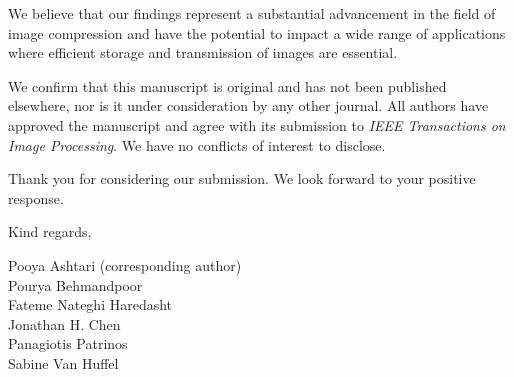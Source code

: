 \documentclass[a4paper,12pt]{letter}
\begin{document}
\begin{letter}
We believe that our findings represent a substantial advancement in the field of image compression and have the potential to impact a wide range of applications where efficient storage and transmission of images are essential.

We confirm that this manuscript is original and has not been published elsewhere, nor is it under consideration by any other journal. All authors have approved the manuscript and agree with its submission to \textit{IEEE Transactions on Image Processing}. We have no conflicts of interest to disclose.

Thank you for considering our submission. We look forward to your positive response.

\closing{Kind regards,}

\vspace{-1.5cm}

Pooya Ashtari (corresponding author) \\
Pourya Behmandpoor \\
Fateme Nateghi Haredasht \\
Jonathan H. Chen \\
Panagiotis Patrinos \\
Sabine Van Huffel \\

\end{letter}
\end{document}

